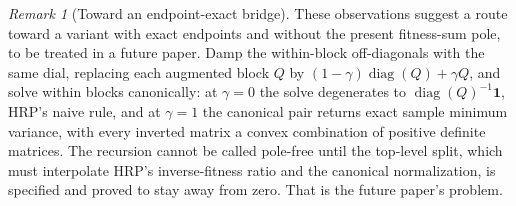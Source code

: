 \documentclass[11pt]{article}
\theoremstyle{remark}
\newtheorem{remark}{Remark}
\begin{document}
\begin{remark}[Toward an endpoint-exact bridge]
\label{rem:exactbridge}
These observations suggest a route toward a variant with exact endpoints
and without the present fitness-sum pole, to be treated in a future
paper. Damp the within-block off-diagonals with the same dial, replacing
each augmented block $Q$ by $(1-\gamma)\operatorname{diag}(Q) + \gamma Q$,
and solve within blocks canonically: at $\gamma = 0$ the solve
degenerates to $\operatorname{diag}(Q)^{-1}\mathbf{1}$, HRP's naive
rule, and at $\gamma = 1$ the canonical pair returns exact sample
minimum variance, with every inverted matrix a convex combination of
positive definite matrices. The recursion cannot be called pole-free
until the top-level split, which must interpolate HRP's inverse-fitness
ratio and the canonical normalization, is specified and proved to stay
away from zero. That is the future paper's problem.
\end{remark}
\end{document}
